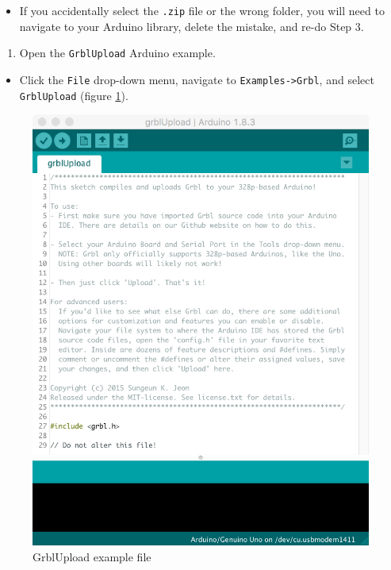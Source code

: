 \documentclass[]{book}
\providecommand{\tightlist}{%
  \setlength{\itemsep}{0pt}\setlength{\parskip}{0pt}}
\theoremstyle{definition}
\theoremstyle{definition}
\theoremstyle{remark}
\begin{document}
\begin{itemize}
\tightlist
\item
  If you accidentally select the \texttt{.zip} file or the wrong folder,
  you will need to navigate to your Arduino library, delete the mistake,
  and re-do Step 3.
\end{itemize}

\begin{enumerate}
\def\labelenumi{\arabic{enumi}.}
\setcounter{enumi}{3}
\tightlist
\item
  Open the \texttt{GrblUpload} Arduino example.
\end{enumerate}

\begin{itemize}
\tightlist
\item
  Click the \texttt{File} drop-down menu, navigate to
  \texttt{Examples-\textgreater{}Grbl}, and select \texttt{GrblUpload}
  (figure \ref{fig:grblUploadFile}).
\end{itemize}

\begin{figure}

{\centering \includegraphics[width=0.75\linewidth]{images/grbl_upload_file} 

}

\caption{GrblUpload example file}\label{fig:grblUploadFile}
\end{figure}
\end{document}
